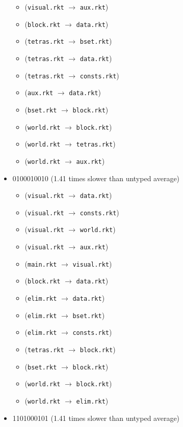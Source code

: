 \documentclass{article}
\newcommand{\mono}[1]{\texttt{#1}}
\begin{document}
\begin{itemize}
  \begin{itemize}
  \item (\mono{visual.rkt} $\rightarrow$ \mono{aux.rkt})
  \item (\mono{block.rkt} $\rightarrow$ \mono{data.rkt})
  \item (\mono{tetras.rkt} $\rightarrow$ \mono{bset.rkt})
  \item (\mono{tetras.rkt} $\rightarrow$ \mono{data.rkt})
  \item (\mono{tetras.rkt} $\rightarrow$ \mono{consts.rkt})
  \item (\mono{aux.rkt} $\rightarrow$ \mono{data.rkt})
  \item (\mono{bset.rkt} $\rightarrow$ \mono{block.rkt})
  \item (\mono{world.rkt} $\rightarrow$ \mono{block.rkt})
  \item (\mono{world.rkt} $\rightarrow$ \mono{tetras.rkt})
  \item (\mono{world.rkt} $\rightarrow$ \mono{aux.rkt})
  \end{itemize}
\item 0100010010 (1.41 times slower than untyped average)
  \begin{itemize}
  \item (\mono{visual.rkt} $\rightarrow$ \mono{data.rkt})
  \item (\mono{visual.rkt} $\rightarrow$ \mono{consts.rkt})
  \item (\mono{visual.rkt} $\rightarrow$ \mono{world.rkt})
  \item (\mono{visual.rkt} $\rightarrow$ \mono{aux.rkt})
  \item (\mono{main.rkt} $\rightarrow$ \mono{visual.rkt})
  \item (\mono{block.rkt} $\rightarrow$ \mono{data.rkt})
  \item (\mono{elim.rkt} $\rightarrow$ \mono{data.rkt})
  \item (\mono{elim.rkt} $\rightarrow$ \mono{bset.rkt})
  \item (\mono{elim.rkt} $\rightarrow$ \mono{consts.rkt})
  \item (\mono{tetras.rkt} $\rightarrow$ \mono{block.rkt})
  \item (\mono{bset.rkt} $\rightarrow$ \mono{block.rkt})
  \item (\mono{world.rkt} $\rightarrow$ \mono{block.rkt})
  \item (\mono{world.rkt} $\rightarrow$ \mono{elim.rkt})
  \end{itemize}
\item 1101000101 (1.41 times slower than untyped average)

\end{itemize}
\end{document}

